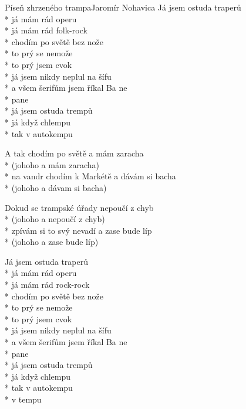 \documentclass[10.5pt]{book}
\begin{document}
\begin{poem}{Píseň zhrzeného trampa}{Jaromír Nohavica}
Já jsem ostuda traperů\\*
já mám rád operu\\*
já mám rád folk-rock\\*
chodím po světě bez nože\\*
to prý se nemože\\*
to prý jsem cvok\\*
já jsem nikdy neplul na šífu\\*
a všem šerifům jsem říkal Ba ne\\*
pane\\*
já jsem ostuda trempů\\*
já když chlempu\\*
tak v autokempu

\begin{altverse}
A tak chodím po světě
a mám zaracha\\*
(johoho a mám zaracha)\\*
na vandr chodím k Markétě
a dávám si bacha\\*
(johoho a dávam si bacha)
\end{altverse}

\begin{altverse}
Dokud se trampské úřady
nepoučí z chyb\\*
(johoho a nepoučí z chyb)\\*
zpívám si to svý nevadí
a zase bude líp\\*
(johoho a zase bude líp)
\end{altverse}

Já jsem ostuda traperů\\*
já mám rád operu\\*
já mám rád rock-rock\\*
chodím po světě bez nože\\*
to prý se nemože\\*
to prý jsem cvok\\*
já jsem nikdy neplul na šífu\\*
a všem šerifům jsem říkal Ba ne\\*
pane\\*
já jsem ostuda trempů\\*
já když chlempu\\*
tak v autokempu\\*
v tempu

\end{poem}
\end{document}
